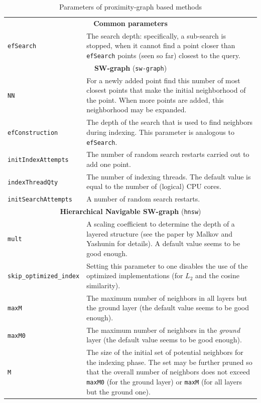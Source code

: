 \documentclass[runningheads,a4paper]{llncs}
\newcommand{\ttt}[1]{\texttt{#1}}
\begin{document}
\begin{table}
\caption{Parameters of proximity-graph based methods\label{TableProxGraphs}}
\centering
\begin{tabular}{l@{\hspace{2mm}}p{3.5in}}
\toprule
\multicolumn{2}{c}{\textbf{Common parameters}}\\
\cmidrule(l){1-2} 
\ttt{efSearch}            & The search depth: specifically, a sub-search is stopped,
                            when it cannot find a point closer than \ttt{efSearch}
                            points (seen so far) closest to the query.
\\
\cmidrule(l){1-2} 
\multicolumn{2}{c}{\textbf{SW-graph} (\ttt{sw-graph}) \cite{Ponomarenko2011,malkov2012scalable,malkov2014}  }\\
\cmidrule(l){1-2} 
\ttt{NN}                  & For a newly added point find this number of most closest points
                            that make the initial neighborhood of the point. When more points are added,
                            this neighborhood may be expanded. \\
\ttt{efConstruction}      & The depth of the search that is used to find neighbors during indexing.
                            This parameter is analogous to \ttt{efSearch}.\\
\ttt{initIndexAttempts}   & The number of random search restarts carried out to add one point.\\
\ttt{indexThreadQty}      & The number of indexing threads. The default value is
                            equal to the number of (logical) CPU cores. \\
\ttt{initSearchAttempts}  & A number of random search restarts. \\
\cmidrule(l){1-2} 
\multicolumn{2}{c}{\textbf{Hierarchical Navigable SW-graph} (\ttt{hnsw}) \cite{malkov2014}  }\\
\cmidrule(l){1-2} 
\ttt{mult}                & A scaling coefficient to determine the depth of a layered structure (see the paper by Malkov and Yashunin \cite{malkov2014} for details). A default value seems to be good enough. \\
\ttt{skip\_optimized\_index}   & Setting this parameter to one disables the use of the optimized implementations (for $L_2$
                                 and the cosine similarity).
                          \\
\ttt{maxM}                & The maximum number of neighbors in all layers but the ground layer (the default value seems to be good enough). \\
\ttt{maxM0}               & The maximum number of neighbors in the \emph{ground} layer (the default value seems to be good enough). \\
\ttt{M}                   & The size of the initial set of potential neighbors for the indexing phase. The set may be further 
                            pruned so that the overall number of neighbors does not exceed \ttt{maxM0} (for the ground layer) or \ttt{maxM}
                            (for all layers but the ground one).\\
 

\end{tabular}
\end{table}
\end{document}
